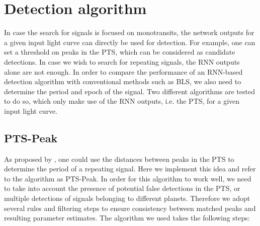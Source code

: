 
\section{Detection algorithm}
\label{sec:algorithm}

In case the search for signals is focused on monotransits, the network outputs for a given input light curve can directly be used for detection. For example, one can set a threshold on peaks in the PTS, which can be considered as candidate detections. In case we wish to search for repeating signals, the RNN outputs alone are not enough. In order to compare the performance of an RNN-based detection algorithm with conventional methods such as BLS, we also need to determine the period and epoch of the signal. Two different algorithms are tested to do so, which only make use of the RNN outputs, i.e. the PTS, for a given input light curve. 

\subsection{PTS-Peak}
\label{sec:pts-peak}
As proposed by \cite{pearson2018searching}, one could use the distances between peaks in the PTS to determine the period of a repeating signal. Here we implement this idea and refer to the algorithm as PTS-Peak. In order for this algorithm to work well, we need to take into account the presence of potential false detections in the PTS, or multiple detections of signals belonging to different planets. Therefore we adopt several rules and filtering steps to ensure consistency between matched peaks and resulting parameter estimates. The algorithm we used takes the following steps:

